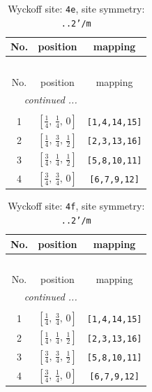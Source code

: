 \documentclass[fleqn,8pt]{jsarticle}
\begin{document}
\renewcommand{\arraystretch}{1.2}
\begin{longtable}{ccc}
\caption{Wyckoff site: {\tt 4e}, site symmetry: {\tt ..2'/m}}
 \\
 \hline \hline
No. & position & mapping \\ \hline \endfirsthead

\multicolumn{2}{l}{\tablename\ \thetable{}} \\
 \hline \hline
No. & position & mapping \\ \hline \endhead

 \hline \hline
\multicolumn{2}{r}{\footnotesize\it continued ...} \\ \endfoot

 \hline \hline
\multicolumn{2}{r}{} \\ \endlastfoot

1 & $\left[ \frac{1}{4},\, \frac{1}{4},\, 0 \right]$ & {\tt [1,4,14,15]} \\ \hline
2 & $\left[ \frac{1}{4},\, \frac{3}{4},\, \frac{1}{2} \right]$ & {\tt [2,3,13,16]} \\ \hline
3 & $\left[ \frac{3}{4},\, \frac{1}{4},\, \frac{1}{2} \right]$ & {\tt [5,8,10,11]} \\ \hline
4 & $\left[ \frac{3}{4},\, \frac{3}{4},\, 0 \right]$ & {\tt [6,7,9,12]} \\
\end{longtable}
\renewcommand{\arraystretch}{1.2}
\begin{longtable}{ccc}
\caption{Wyckoff site: {\tt 4f}, site symmetry: {\tt ..2'/m}}
 \\
 \hline \hline
No. & position & mapping \\ \hline \endfirsthead

\multicolumn{2}{l}{\tablename\ \thetable{}} \\
 \hline \hline
No. & position & mapping \\ \hline \endhead

 \hline \hline
\multicolumn{2}{r}{\footnotesize\it continued ...} \\ \endfoot

 \hline \hline
\multicolumn{2}{r}{} \\ \endlastfoot

1 & $\left[ \frac{1}{4},\, \frac{3}{4},\, 0 \right]$ & {\tt [1,4,14,15]} \\ \hline
2 & $\left[ \frac{1}{4},\, \frac{1}{4},\, \frac{1}{2} \right]$ & {\tt [2,3,13,16]} \\ \hline
3 & $\left[ \frac{3}{4},\, \frac{3}{4},\, \frac{1}{2} \right]$ & {\tt [5,8,10,11]} \\ \hline
4 & $\left[ \frac{3}{4},\, \frac{1}{4},\, 0 \right]$ & {\tt [6,7,9,12]} \\
\end{longtable}
\end{document}
